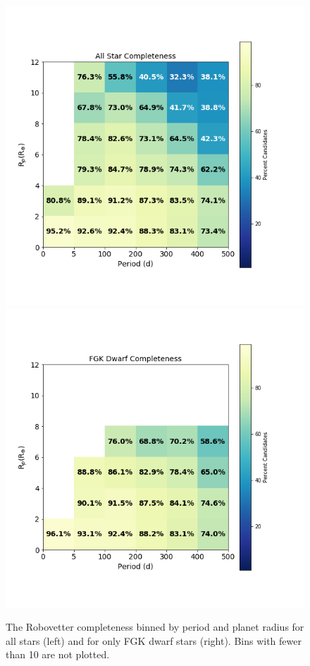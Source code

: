 \begin{figure}[ht]
\begin{center}
\includegraphics[width=0.47\linewidth]{fig-AllCompletePR.png}
\includegraphics[width=0.47\linewidth]{fig-FgkCompletePR.png}
\caption{The Robovetter completeness binned by period and planet radius for all stars (left) and for only FGK dwarf stars (right). Bins with fewer than 10  are not plotted.}
\label{f:prCompleteness}
\end{center}
\end{figure}


